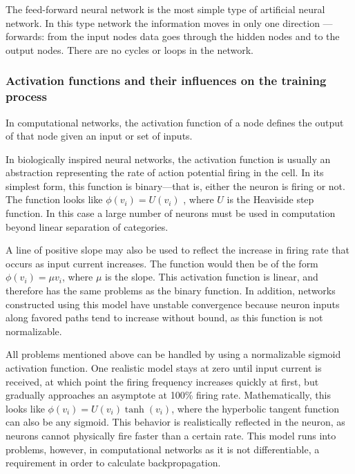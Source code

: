\documentclass[a4paper,12pt]{article}
\begin{document}

The feed-forward neural network is the most simple type of artificial neural network. In this type network the information moves in only one direction — forwards: from the input nodes data goes through the hidden nodes and to the output nodes. There are no cycles or loops in the network.

\subsubsection{Activation functions and their influences on the training process}

In computational networks, the activation function of a node defines the output of that node given an input or set of inputs.

In biologically inspired neural networks, the activation function is usually an abstraction representing the rate of action potential firing in the cell. In its simplest form, this function is binary—that is, either the neuron is firing or not. The function looks like $\phi(v_i)=U(v_i)$ , where $U$ is the Heaviside step function. In this case a large number of neurons must be used in computation beyond linear separation of categories.

A line of positive slope may also be used to reflect the increase in firing rate that occurs as input current increases. The function would then be of the form $\phi(v_i)=\mu v_i$, where $\mu$ is the slope. This activation function is linear, and therefore has the same problems as the binary function. In addition, networks constructed using this model have unstable convergence because neuron inputs along favored paths tend to increase without bound, as this function is not normalizable.

All problems mentioned above can be handled by using a normalizable sigmoid activation function. One realistic model stays at zero until input current is received, at which point the firing frequency increases quickly at first, but gradually approaches an asymptote at 100\% firing rate. Mathematically, this looks like $\phi(v_i)=U(v_i)\tanh(v_i)$, where the hyperbolic tangent function can also be any sigmoid. This behavior is realistically reflected in the neuron, as neurons cannot physically fire faster than a certain rate. This model runs into problems, however, in computational networks as it is not differentiable, a requirement in order to calculate backpropagation.
\end{document}

